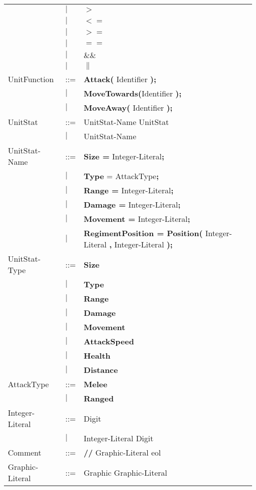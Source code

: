 \begin{center}
\begin{longtable}{l l l}
									&$\mid$	&$\boldsymbol {>}$\\
									&$\mid$	&$\boldsymbol {<=}$\\
									&$\mid$	&$\boldsymbol {>=}$\\
									&$\mid$	&$\boldsymbol {==}$\\
									&$\mid$	&$\boldsymbol {\&\&}$\\
									&$\mid$	&$\boldsymbol {\|}$\\
				UnitFunction		&	::=	&{\bf Attack(} Identifier {\bf );} \\
									&$\mid$	&{\bf MoveTowards(}Identifier {\bf );} \\
									&$\mid$	&{\bf MoveAway(} Identifier {\bf );} \\
				UnitStat			&	::=	&UnitStat-Name UnitStat \\
									&$\mid$	&UnitStat-Name \\
				UnitStat-Name		&	::=	&{\bf Size =} Integer-Literal{\bf ;} \\
									&$\mid$	&{\bf Type} = AttackType{\bf ;}\\
									&$\mid$	&{\bf  Range =} Integer-Literal{\bf;}\\
									&$\mid$	&{\bf Damage =} Integer-Literal{\bf ;}\\
									&$\mid$	&{\bf Movement = }Integer-Literal{\bf ;} \\				  
									&$\mid$	& {\bf RegimentPosition = Position(} Integer-Literal {\bf ,} Integer-Literal {\bf );}\\
				UnitStat-Type		&	::=	&{\bf Size}\\
									&$\mid$	&{\bf Type}\\
									&$\mid$	&{\bf  Range}\\
									&$\mid$	&{\bf Damage}\\
									&$\mid$	&{\bf Movement}\\
									&$\mid$	&{\bf AttackSpeed}\\
									&$\mid$	&{\bf Health}\\
									&$\mid$	&{\bf Distance}\\
				AttackType			&	::=	&{\bf Melee}\\
									&$\mid$	&{\bf Ranged}\\
				Integer-Literal		&	::=	&Digit\\
									&$\mid$	&Integer-Literal Digit\\
				Comment				&	::=	&{\bf //} Graphic-Literal eol\\
				Graphic-Literal		&	::=	&Graphic Graphic-Literal\\

\end{longtable}
\end{center}
